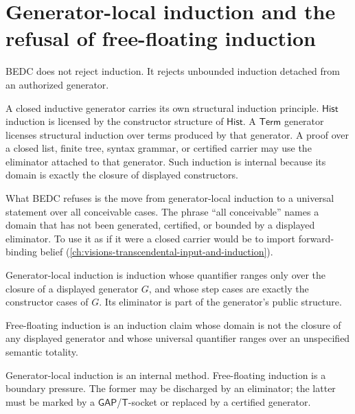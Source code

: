 \section{Generator-local induction and the refusal of free-floating induction}
\label{sec:external-supply-generator-induction}

BEDC does not reject induction. It rejects unbounded induction detached from an authorized generator.

A closed inductive generator carries its own structural induction principle. $\mathsf{Hist}$ induction is licensed by the constructor structure of $\mathsf{Hist}$. A $\mathsf{Term}$ generator licenses structural induction over terms produced by that generator. A proof over a closed list, finite tree, syntax grammar, or certified carrier may use the eliminator attached to that generator. Such induction is internal because its domain is exactly the closure of displayed constructors.

What BEDC refuses is the move from generator-local induction to a universal statement over all conceivable cases. The phrase ``all conceivable'' names a domain that has not been generated, certified, or bounded by a displayed eliminator. To use it as if it were a closed carrier would be to import forward-binding belief (\autoref{ch:visions-transcendental-input-and-induction}).

\begin{definition}
\label{def:external-supply-generator-local-induction}
Generator-local induction is induction whose quantifier ranges only over the closure of a displayed generator $G$, and whose step cases are exactly the constructor cases of $G$. Its eliminator is part of the generator's public structure.
\end{definition}

\begin{definition}
\label{def:external-supply-free-floating-induction}
Free-floating induction is an induction claim whose domain is not the closure of any displayed generator and whose universal quantifier ranges over an unspecified semantic totality.
\end{definition}

\begin{principle}
\label{prin:external-supply-induction-boundary}
Generator-local induction is an internal method. Free-floating induction is a boundary pressure. The former may be discharged by an eliminator; the latter must be marked by a $\mathsf{GAP}$/$\mathsf{T}$-socket or replaced by a certified generator.
\end{principle}

